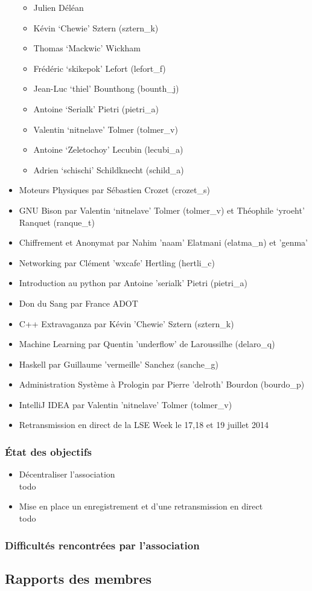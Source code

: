 \documentclass[12pt]{report}
\begin{document}
\begin{itemize}
\begin{itemize}
        \item Julien Déléan
        \item Kévin `Chewie' Sztern (sztern\_k)
        \item Thomas `Mackwic' Wickham
        \item Frédéric `skikepok' Lefort (lefort\_f)
        \item Jean-Luc `thiel' Bounthong (bounth\_j)
        \item Antoine `Serialk' Pietri (pietri\_a)
        \item Valentin `nitnelave' Tolmer (tolmer\_v)
        \item Antoine `Zeletochoy' Lecubin (lecubi\_a)
        \item Adrien `schischi' Schildknecht (schild\_a)
      \end{itemize}
    \item Moteurs Physiques par Sébastien Crozet (crozet\_s)
    \item GNU Bison par Valentin `nitnelave' Tolmer (tolmer\_v) et Théophile `yroeht' Ranquet (ranque\_t)
    \item Chiffrement et Anonymat par Nahim 'naam' Elatmani (elatma\_n) et 'genma'
    \item Networking par Clément 'wxcafe' Hertling (hertli\_c)
    \item Introduction au python par Antoine 'serialk' Pietri (pietri\_a)
    \item Don du Sang par France ADOT
    \item C++ Extravaganza par Kévin 'Chewie' Sztern (sztern\_k)
    \item Machine Learning par Quentin 'underflow' de Laroussilhe (delaro\_q)
    \item Haskell par Guillaume 'vermeille' Sanchez (sanche\_g)
    \item Administration Système à Prologin par Pierre 'delroth' Bourdon
            (bourdo\_p)
    \item IntelliJ IDEA par Valentin 'nitnelave' Tolmer (tolmer\_v)
    \item Retransmission en direct de la LSE Week le 17,18 et 19 juillet 2014
  \end{itemize}
    \subsection{État des objectifs}
    \begin{itemize}
            \item Décentraliser l'association \\
                    todo
            \item Mise en place un enregistrement et d'une retransmission en
                    direct\\
                    todo
    \end{itemize}
    \subsection{Difficultés rencontrées par l'association}
  \begin{appendices}
    \chapter{Rapports des membres}
    
    
  \end{appendices}
\end{document}
